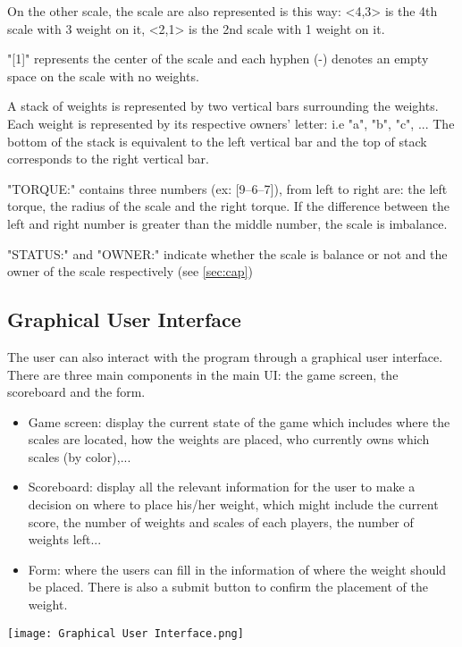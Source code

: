 \documentclass[12pt]{article}
\begin{document}
On the other scale, the scale are also represented is this way: <4,3> is the
4th scale with 3 weight on it, <2,1> is the 2nd scale with 1 weight on it. 

"[1]" represents the center of the scale and each hyphen (-) denotes an empty
space on the scale with no weights.

A stack of weights is represented by two vertical bars surrounding the weights.
Each weight is represented by its respective owners' letter: i.e "a", "b", "c",
... The bottom of the stack is equivalent to the left vertical bar and the top
of stack corresponds to the right vertical bar.

"TORQUE:" contains three numbers (ex: [9--6--7]), from left to right are: the
left torque, the radius of the scale and the right torque. If the difference
between the left and right number is greater than the middle number, the scale
is imbalance.

"STATUS:" and "OWNER:" indicate whether the scale is balance or not and the
owner of the scale respectively (see \autoref{sec:cap})

\subsection{Graphical User Interface} 
The user can also interact with the program through a graphical user interface.
There are three main components in the main UI: the game screen, the scoreboard and
the form. 
\begin{itemize}
  \item Game screen: display the current state of the game which includes
    where the scales are located, how the weights are placed, who currently owns
    which scales (by color),...
  \item Scoreboard: display all the relevant information for the user to
    make a decision on where to place his/her weight, which might include the
    current score, the number of weights and scales of each players, the number
    of weights left...
  \item Form: where the users can fill in the information of where the
    weight should be placed. There is also a submit button to confirm the
    placement of the weight.
\end{itemize}

\begin{center}
  \texttt{[image: Graphical User Interface.png]}
\end{center}
\end{document}

